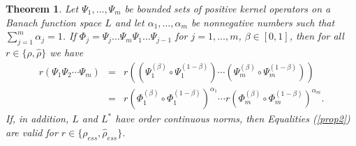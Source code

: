 \documentclass[12pt, reqno]{amsart}
\newtheorem{theorem}{Theorem}[section]
\theoremstyle{definition}
\theoremstyle{remark}
\numberwithin{equation}{section}
\begin{document}
\begin{theorem}
\label{equalities_joint}
Let $\Psi _1, \ldots , \Psi _m$ be bounded sets of positive kernel operators on a Banach function space $L$ and let $\alpha_1, \ldots ,\alpha_m$ be nonnegative numbers such that $\sum_{j=1}^{m}\alpha_j=1$. If  $ \Phi _j=\Psi_j\ldots\Psi_m \Psi_1\ldots\Psi_{j-1}$ for $j=1,\ldots , m$, $\beta\in [0,1]$, then for all $r\in \{ \rho, \hat{\rho}\}$ we have
\begin{eqnarray}
\nonumber
 r\left(\Psi_1\Psi_2\cdots\Psi_m\right)&=&r\left(\left(\Psi_1^{(\beta)}\circ\Psi_1^{(1-\beta)}\right)
\cdots\left(\Psi_m^{(\beta)}\circ\Psi_m^{(1-\beta)}\right)\right)\\
&=&
r\left(\Phi_1^{(\beta)}\circ\Phi_1^{(1-\beta)}\right)^{\alpha_1}\cdots
r\left(\Phi_m^{(\beta)}\circ\Phi_m^{(1-\beta)}\right)^{\alpha_m}.
\label{prop2}
\end{eqnarray}
If, in addition, $L$ and $L^*$ have order continuous norms, then Equalities (\ref{prop2}) are valid for $r\in \{\rho_{ess}, \hat{\rho} _{ess}\}$.
\end{theorem}
\end{document}
